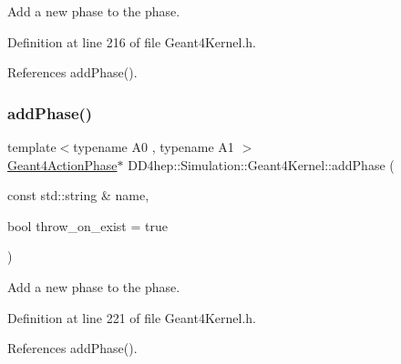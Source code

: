 Add a new phase to the phase. 



Definition at line 216 of file Geant4\+Kernel.\+h.



References add\+Phase().

\hypertarget{class_d_d4hep_1_1_simulation_1_1_geant4_kernel_a7b0facce444f94e34bf9828d8b418e44}{}\label{class_d_d4hep_1_1_simulation_1_1_geant4_kernel_a7b0facce444f94e34bf9828d8b418e44} 
\subsubsection{\texorpdfstring{add\+Phase()}{addPhase()}\hspace{0.1cm}{\footnotesize\ttfamily [3/4]}}
{\footnotesize\ttfamily template$<$typename A0 , typename A1 $>$ \\
\hyperlink{class_d_d4hep_1_1_simulation_1_1_geant4_action_phase}{Geant4\+Action\+Phase}$\ast$ D\+D4hep\+::\+Simulation\+::\+Geant4\+Kernel\+::add\+Phase (\begin{DoxyParamCaption}\item[{const std\+::string \&}]{name,  }\item[{bool}]{throw\+\_\+on\+\_\+exist = {\ttfamily true} }\end{DoxyParamCaption})\hspace{0.3cm}{\ttfamily [inline]}}



Add a new phase to the phase. 



Definition at line 221 of file Geant4\+Kernel.\+h.



References add\+Phase().

\hypertarget{class_d_d4hep_1_1_simulation_1_1_geant4_kernel_afc77080c02b923ee7ba39519e7d73acb}{}\label{class_d_d4hep_1_1_simulation_1_1_geant4_kernel_afc77080c02b923ee7ba39519e7d73acb} 
